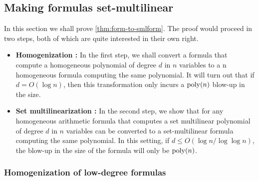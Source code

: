 \subsection{Making formulas set-multilinear}

In this section we shall prove \autoref{thm:form-to-smlform}.
The proof would proceed in two steps, both of which are quite interested in their own right.
\begin{itemize}
\setlength\itemsep{0em}
\item {\bf Homogenization :} In the first step, we shall convert a
  formula that compute a homogeneous polynomial of degree $d$ in $n$ variables to a n homogeneous formula computing the same polynomial.
It will turn out that if $d = O(\log n)$, then this transformation only incurs a $\operatorname{poly}(n)$ blow-up in the size.
\item {\bf Set multilinearization :} In the second step, we show that
  for any homogeneous arithmetic formula that computes a set multilinear polynomial of degree $d$ in $n$ variables can be converted to a set-multilinear formula computing the same polynomial.
In this setting, if $d \leq O(\log n/\log \log n)$, the blow-up in the size of the formula will only be $\operatorname{poly}(n)$.
\end{itemize}

\subsubsection*{Homogenization of low-degree formulas}

